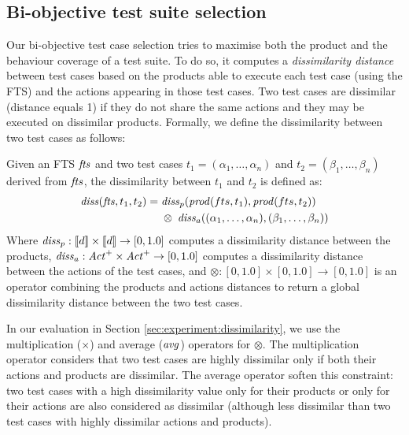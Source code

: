 \subsection{Bi-objective test suite selection}

Our bi-objective test case selection \cite{Devroey2016} tries to maximise both the product and the behaviour coverage of a test suite. To do so, it computes a \emph{dissimilarity distance} between test cases based on the products able to execute each test case (using the FTS) and the actions appearing in those test cases. Two test cases are dissimilar (distance equals 1) if they do not share the same actions and they may be executed on dissimilar products. Formally, we define the dissimilarity between two test cases as follows:
%
\begin{definition}
Given an FTS $\mathit{fts}$ and two test cases $t_1=(\alpha_1, \ldots, \alpha_n)$ and $t_2= (\beta_1, \ldots, \beta_n)$ derived from $\mathit{fts}$, the dissimilarity between $t_1$ and $t_2$ is defined as:
%
\begin{align*}
\mathit{diss}(\mathit{fts}, t_1, t_2) =& \; \mathit{diss}_p(\mathit{prod}(fts, t_1), \mathit{prod}(fts, t_2)) \\
	 & \; \otimes \; \mathit{diss}_a((\alpha_1, \ldots, \alpha_n),(\beta_1, \ldots, \beta_n))
\end{align*}
%
Where $\mathit{diss}_p: [\![ d]\!] \times [\![ d]\!] \rightarrow [0, 1.0]$ computes a dissimilarity distance between the products, $\mathit{diss}_a: \mathit{Act}^{+} \times \mathit{Act}^{+} \rightarrow [0, 1.0]$ computes a dissimilarity distance between the actions of the test cases, and $\otimes: [0, 1.0] \times [0, 1.0] \rightarrow [0, 1.0]$ is an operator combining the products and actions distances to return a global dissimilarity distance between the two test cases.
\end{definition}

In our evaluation in Section \ref{sec:experiment:dissimilarity}, we use the multiplication ($\times$) and average ($\mathit{avg}$) operators for $\otimes$. The multiplication operator considers that two test cases are highly dissimilar only if both their actions and products are dissimilar. The average operator soften this constraint: two test cases with a high dissimilarity value only for their products or only for their actions are also considered as dissimilar (although less dissimilar than two test cases with highly dissimilar actions and products).

